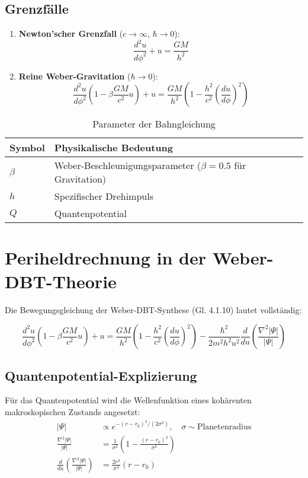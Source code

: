 \subsection{Grenzfälle}
\begin{enumerate}
\item \textbf{Newton'scher Grenzfall} ($c\to\infty$, $\hbar\to0$):
\begin{equation}
\frac{d^2u}{d\phi^2} + u = \frac{GM}{h^2}
\end{equation}

\item \textbf{Reine Weber-Gravitation} ($\hbar\to0$):
\begin{equation}
\frac{d^2u}{d\phi^2}\left(1-\beta\frac{GM}{c^2}u\right) + u = \frac{GM}{h^2}\left(1-\frac{h^2}{c^2}\left(\frac{du}{d\phi}\right)^2\right)
\end{equation}
\end{enumerate}

\begin{table}[h]
\centering
\caption{Parameter der Bahngleichung}
\begin{tabular}{ll}
\hline
Symbol & Physikalische Bedeutung \\ \hline
$\beta$ & Weber-Beschleunigungsparameter ($\beta=0.5$ für Gravitation) \\
$h$ & Spezifischer Drehimpuls \\
$Q$ & Quantenpotential \\
\hline
\end{tabular}
\end{table}

\section{Periheldrechnung in der Weber-DBT-Theorie}
Die Bewegungsgleichung der Weber-DBT-Synthese (Gl. 4.1.10) lautet vollständig:

\begin{equation}
\frac{d^2 u}{d\phi^2} \left(1 - \beta \frac{GM}{c^2} u \right) + u = \frac{GM}{h^2} \left(1 - \frac{h^2}{c^2} \left(\frac{du}{d\phi}\right)^2 \right) - \frac{\hbar^2}{2m^2 h^2 u^2} \frac{d}{du} \left(\frac{\nabla^2 |\Psi|}{|\Psi|} \right)
\end{equation}

\subsection{Quantenpotential-Explizierung}
Für das Quantenpotential wird die Wellenfunktion eines kohärenten makroskopischen Zustands angesetzt:
\begin{align}
|\Psi| &\propto e^{-(r - r_0)^2/(2\sigma^2)}, \quad \sigma \sim \text{Planetenradius} \\
\frac{\nabla^2 |\Psi|}{|\Psi|} &= \frac{1}{\sigma^2}\left(1 - \frac{(r - r_0)^2}{\sigma^2}\right) \\
\frac{d}{du} \left(\frac{\nabla^2 |\Psi|}{|\Psi|}\right) &= \frac{2r^3}{\sigma^4}(r - r_0)
\end{align}

